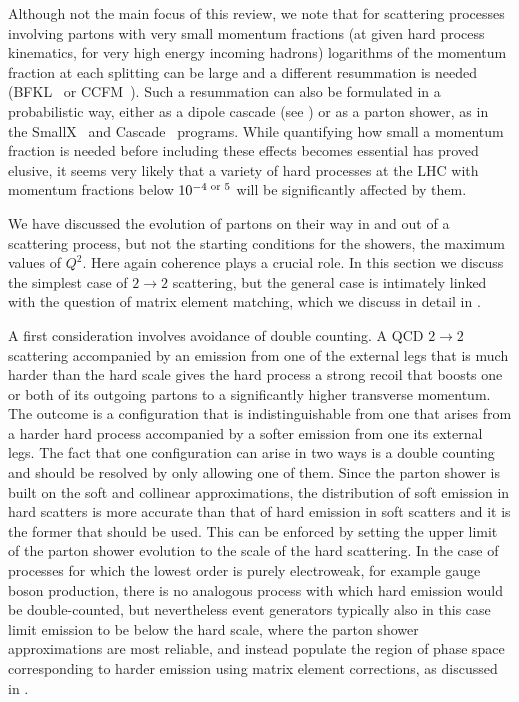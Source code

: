 Although not the main focus of this review, we note that for scattering
processes involving partons with very small momentum fractions (\ie at
given hard process kinematics, for very high energy incoming hadrons)
logarithms of the momentum fraction at each splitting can be large and a
different resummation is needed
(BFKL~\cite{Balitsky:1978ic,Kuraev:1977fs} or CCFM~\cite{Catani:1989sg}).
Such a resummation
can also be formulated in a probabilistic way, either as a dipole
cascade (see ) or as a parton shower, as in the
SmallX~\cite{Marchesini:1992jw} and Cascade~\cite{Jung:2000hk} programs.
While quantifying how small a momentum fraction is needed before
including these effects becomes essential has proved elusive, it seems
very likely that a variety of hard processes at the LHC with momentum
fractions below $10^{-4\mbox{\scriptsize~or~}5}$ will be significantly
affected by them.

\label{parton-shower:initial-conditions}
We have discussed the evolution of partons on their way in and out of a
scattering process, but not the starting conditions for the showers,
\ie the maximum values of $Q^2$.  Here again coherence plays a crucial
role.  In this section we discuss the simplest case of $2\to2$
scattering, but the general case is intimately linked with the question
of matrix element matching, which we discuss in detail in
.

A first consideration involves avoidance of double counting.  A QCD $2\to2$
scattering accompanied by an emission from one of the external legs that
is much harder than the hard scale gives the hard process a strong
recoil that boosts one or both of its outgoing partons to a significantly
higher transverse momentum.  The outcome is a configuration that is
indistinguishable from one that arises from a harder hard process
accompanied by a softer emission from one its external legs.  The fact
that one configuration can arise in two ways is a double counting and
should be resolved by only allowing one of them.  Since the parton
shower is built on the soft and collinear approximations, the
distribution of soft emission in hard scatters is more accurate than
that of hard emission in soft scatters and it is the former that should
be used.  This can be enforced by setting the upper limit of the parton
shower evolution to the scale of the hard scattering.  In the case of
processes for which the lowest order is purely electroweak, for example
gauge boson production, there is no analogous process with which hard
emission would be double-counted, but nevertheless event generators
typically also in this case limit emission to be below the hard scale,
where the parton shower approximations are most reliable, and instead
populate the region of phase space corresponding to harder emission
using matrix element corrections, as discussed
in .

